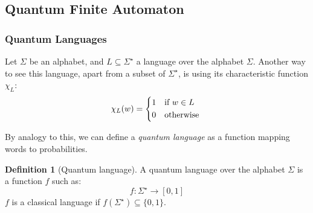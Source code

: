 \documentclass[12pt,a4paper]{article}
\theoremstyle{plain}
\theoremstyle{definition}
\newtheorem*{definition}{Definition}
\begin{document}
\subsection{Quantum Finite Automaton}
\subsubsection{Quantum Languages}
Let $\Sigma$ be an alphabet, and $L\subseteq \Sigma^\star$ a language over the alphabet $\Sigma$. Another way to see this language, apart from a subset of $\Sigma^\star$, is using its characteristic function $\chi_L$:
\begin{equation*}
    \chi_L(w) = \begin{cases*}
        1 & if $w\in L$\\
        0 & otherwise
    \end{cases*}
\end{equation*}

By analogy to this, we can define a \emph{quantum language} as a function mapping words to probabilities. \cite{quantum-automata-grammars}
\begin{definition}[Quantum language]
    A quantum language over the alphabet $\Sigma$ is a function $f$ such as:
    \begin{equation*}
        f : \Sigma^\star \to [0, 1]
    \end{equation*}
    $f$ is a classical language if $f(\Sigma^\star) \subseteq \{0, 1\}$.
\end{definition}
\end{document}
